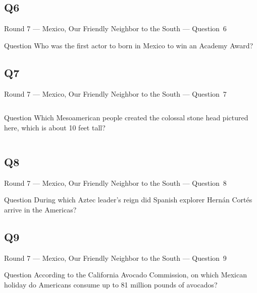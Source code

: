 \documentclass[11pt]{beamer}
\begin{document}
\subsection*{Q6}
\begin{frame}[t]{Round 7 --- Mexico, Our Friendly Neighbor to the South --- \mbox{Question 6}}
\vspace{-0.5em}
\begin{block}{Question}
Who was the first actor to born in Mexico to win an Academy Award?
\end{block}
\end{frame}
\subsection*{Q7}
\begin{frame}[t]{Round 7 --- Mexico, Our Friendly Neighbor to the South --- \mbox{Question 7}}
\vspace{-0.5em}
\begin{columns}[T,totalwidth=\linewidth]
\begin{column}{0.32\linewidth}
\begin{block}{Question}
Which Mesoamerican people created the colossal stone head pictured here, which is about 10 feet tall?
\end{block}
\end{column}
\begin{column}{0.65\linewidth}
\begin{center}
\texttt{[image: \{Images/olmechead]}.jpg}
\end{center}
\end{column}
\end{columns}
\end{frame}
\subsection*{Q8}
\begin{frame}[t]{Round 7 --- Mexico, Our Friendly Neighbor to the South --- \mbox{Question 8}}
\vspace{-0.5em}
\begin{block}{Question}
During which Aztec leader's reign did Spanish explorer Hernán Cortés arrive in the Americas?
\end{block}
\end{frame}
\subsection*{Q9}
\begin{frame}[t]{Round 7 --- Mexico, Our Friendly Neighbor to the South --- \mbox{Question 9}}
\vspace{-0.5em}
\begin{block}{Question}
According to the California Avocado Commission, on which Mexican holiday do Americans consume up to 81 million pounds of  avocados?
\end{block}
\end{frame}
\end{document}
